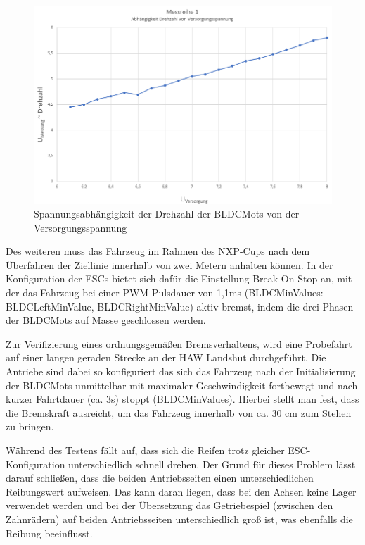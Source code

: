 \begin{figure}[H] %
\includegraphics[width=.90\textwidth]{sec4/images/PruefstandMess02} 
\centering
\captionsetup{width=.95\textwidth}
\caption [Spannungsabhängigkeit der Drehzahl von der Versorgungsspannung]{Spannungsabhängigkeit der Drehzahl der \acp{BLDCMot} von der Versorgungsspannung}\centering
\label{fig:Pruefstand02}
\end{figure}

Des weiteren muss das Fahrzeug im Rahmen des NXP-Cups nach dem Überfahren der Ziellinie innerhalb von zwei Metern anhalten können. In der Konfiguration der \acp{ESC} bietet sich dafür die Einstellung \glqq{}Break On Stop\grqq{} an, mit der das Fahrzeug bei einer PWM-Pulsdauer von 1,1ms (BLDCMinValues: BLDCLeftMinValue, BLDCRightMinValue) aktiv bremst, indem die drei Phasen der \acp{BLDCMot} auf Masse geschlossen werden.\vspace{11pt}

Zur Verifizierung eines ordnungsgemäßen Bremsverhaltens, wird eine Probefahrt auf einer langen geraden Strecke an der HAW Landshut durchgeführt. Die Antriebe sind dabei so konfiguriert das sich das Fahrzeug nach der Initialisierung der \acp{BLDCMot} unmittelbar mit maximaler Geschwindigkeit fortbewegt und nach kurzer Fahrtdauer (ca. 3s) stoppt (BLDCMinValues). Hierbei stellt man fest, dass die Bremskraft ausreicht, um das Fahrzeug innerhalb von ca. 30 cm zum Stehen zu bringen.\vspace{11pt}

Während des Testens fällt auf, dass sich die Reifen trotz gleicher ESC-Konfiguration unterschiedlich schnell drehen. Der Grund für dieses Problem lässt darauf schließen, dass die beiden Antriebsseiten einen unterschiedlichen Reibungswert aufweisen. Das kann daran liegen, dass bei den Achsen keine Lager verwendet werden und bei der Übersetzung das Getriebespiel (zwischen den Zahnrädern) auf beiden Antriebsseiten unterschiedlich groß ist, was ebenfalls die Reibung beeinflusst.\vspace{11pt}

